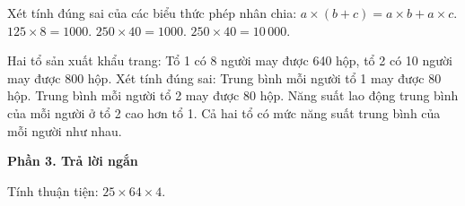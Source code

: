 \begin{ex} %
Xét tính đúng sai của các biểu thức phép nhân chia:
\choiceTF
{\True $a \times (b + c) = a \times b + a \times c$.}
{\True $125 \times 8 = 1000$.}
{$250 \times 40 = 1000$.}
{\True $250 \times 40 = 10\,000$.}
\end{ex}

\begin{ex} %
Hai tổ sản xuất khẩu trang: Tổ 1 có 8 người may được 640 hộp, tổ 2 có 10 người may được 800 hộp. Xét tính đúng sai:
\choiceTF
{\True Trung bình mỗi người tổ 1 may được 80 hộp.}
{\True Trung bình mỗi người tổ 2 may được 80 hộp.}
{Năng suất lao động trung bình của mỗi người ở tổ 2 cao hơn tổ 1.}
{\True Cả hai tổ có mức năng suất trung bình của mỗi người như nhau.}
\end{ex}

\textbf{Phần 3. Trả lời ngắn}

\begin{ex} %
Tính thuận tiện: $25 \times 64 \times 4$.
\end{ex}

